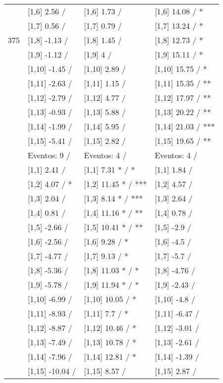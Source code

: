 \begin{table}
\begin{tabular}[t]{llll}
 & {}[1,6] 2.56  / & {}[1,6] 1.73  / & {}[1,6] 14.08  / *\\
 & {}[1,7] 0.56  / & {}[1,7] 0.79  / & {}[1,7] 13.24  / *\\
375 & {}[1,8] -1.13  / & {}[1,8] 1.45  / & {}[1,8] 12.73  / *\\
\addlinespace
 & {}[1,9] -1.12  / & {}[1,9] 4  / & {}[1,9] 15.11  / *\\
 & {}[1,10] -1.45  / & {}[1,10] 2.89  / & {}[1,10] 15.75  / *\\
 & {}[1,11] -2.63  / & {}[1,11] 1.15  / & {}[1,11] 15.35  / **\\
 & {}[1,12] -2.79  / & {}[1,12] 4.77  / & {}[1,12] 17.97  / **\\
 & {}[1,13] -0.93  / & {}[1,13] 5.88  / & {}[1,13] 20.22  / **\\
\addlinespace
 & {}[1,14] -1.99  / & {}[1,14] 5.95  / & {}[1,14] 21.03  / ***\\
 & {}[1,15] -5.41  / & {}[1,15] 2.82  / & {}[1,15] 19.65  / **\\
 & Eventos:  9 / & Eventos:  4 / & Eventos:  4 /\\
 & {}[1,1] 2.41  / & {}[1,1] 7.31 * / * & {}[1,1] 1.84  /\\
 & {}[1,2] 4.07  / * & {}[1,2] 11.45 * / *** & {}[1,2] 4.57  /\\
\addlinespace
 & {}[1,3] 2.04  / & {}[1,3] 8.14 * / *** & {}[1,3] 2.64  /\\
 & {}[1,4] 0.81  / & {}[1,4] 11.16 * / ** & {}[1,4] 0.78  /\\
 & {}[1,5] -2.66  / & {}[1,5] 10.41 * / ** & {}[1,5] -2.9  /\\
 & {}[1,6] -2.56  / & {}[1,6] 9.28  / * & {}[1,6] -4.5  /\\
 & {}[1,7] -4.77  / & {}[1,7] 9.13  / * & {}[1,7] -5.7  /\\
\addlinespace
500 & {}[1,8] -5.36  / & {}[1,8] 11.03 * / * & {}[1,8] -4.76  /\\
 & {}[1,9] -5.78  / & {}[1,9] 11.94 * / * & {}[1,9] -2.43  /\\
 & {}[1,10] -6.99  / & {}[1,10] 10.05  / * & {}[1,10] -4.8  /\\
 & {}[1,11] -8.93  / & {}[1,11] 7.7  / * & {}[1,11] -6.47  /\\
 & {}[1,12] -8.87  / & {}[1,12] 10.46  / * & {}[1,12] -3.01  /\\
\addlinespace
 & {}[1,13] -7.49  / & {}[1,13] 10.78  / * & {}[1,13] -2.61  /\\
 & {}[1,14] -7.96  / & {}[1,14] 12.81  / * & {}[1,14] -1.39  /\\
 & {}[1,15] -10.04  / & {}[1,15] 8.57  / & {}[1,15] 2.87  /\\
\bottomrule
\end{tabular}
\end{table}
